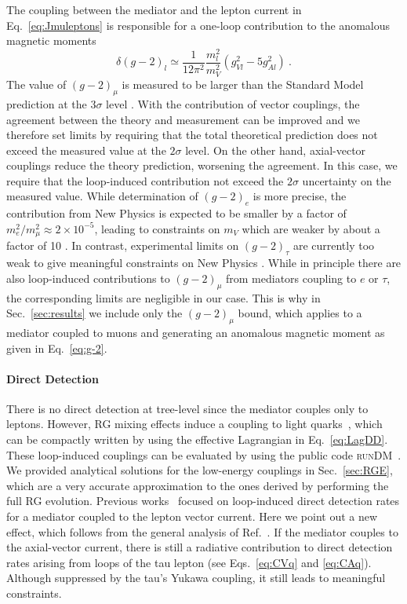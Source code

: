 \documentclass[final,5p,twocolumn]{elsarticle}
\newcommand{\be}{\begin{equation}}
\newcommand{\ee}{\end{equation}}
\newcommand{\Eq}[1]{Eq.~\eqref{#1}}
\newcommand{\Eqs}[2]{Eqs.~\eqref{#1} and \eqref{#2}}
\newcommand{\Ref}[1]{Ref.~\cite{#1}}
\newcommand{\runDM}{\textsc{runDM}\xspace}
\begin{document}
The coupling between the mediator and the lepton current in \Eq{eq:Jmuleptons} is responsible for a one-loop contribution to the anomalous magnetic moments~\cite{Agrawal:2014ufa}
\be\label{eq:g-2}
\delta(g-2)_l \simeq \frac{1}{12 \pi^2} \frac{m_l^2}{m_V^2} \left( g_{Vl}^2 - 5 g_{Al}^2 \right) \ .
\ee
The value of $(g-2)_\mu$ is measured to be larger than the Standard Model prediction at the $3\sigma$ level \cite{Beringer:1900zz}. With the contribution of vector couplings, the agreement between the theory and measurement can be improved and we therefore set limits by requiring that the total theoretical prediction does not exceed the measured value at the $2\sigma$ level. On the other hand, axial-vector couplings reduce the theory prediction, worsening the agreement. In this case, we require that the loop-induced contribution not exceed the $2\sigma$ uncertainty on the measured value. While determination of $(g-2)_e$ is more precise, the contribution from New Physics is expected to be smaller by a factor of $m_e^2/m_\mu^2 \approx 2 \times 10^{-5}$, leading to constraints on $m_V$ which are weaker by about a factor of 10 \cite{Bell:2014tta}. In contrast, experimental limits on $(g-2)_\tau$ are currently too weak to give meaningful constraints on New Physics \cite{Eidelman:2007sb}. While in principle there are also loop-induced contributions to $(g-2)_\mu$ from mediators coupling to $e$ or $\tau$, the corresponding limits are negligible in our case. This is why in Sec.~\ref{sec:results} we include only the $(g-2)_\mu$ bound, which applies to a mediator coupled to muons and generating an anomalous magnetic moment as given in \Eq{eq:g-2}.

\paragraph{Direct Detection} There is no direct detection at tree-level since the mediator couples only to leptons. However, RG mixing effects induce a coupling to light quarks~\cite{Crivellin:2014qxa,D'Eramo:2014aba}, which can be compactly written by using the effective Lagrangian in \Eq{eq:LagDD}. These loop-induced couplings can be evaluated by using the public code \runDM~\cite{runDM}. We provided analytical solutions for the low-energy couplings in Sec.~\ref{sec:RGE}, which are a very accurate approximation to the ones derived by performing the full RG evolution.  Previous works~\cite{Kopp:2009et,Bell:2014tta} focused on loop-induced direct detection rates for a mediator coupled to the lepton vector current. Here we point out a new effect, which follows from the general analysis of \Ref{D'Eramo:2014aba}. If the mediator couples to the axial-vector current, there is still a radiative contribution to direct detection rates arising from loops of the tau lepton (see \Eqs{eq:CVq}{eq:CAq}). Although suppressed by the tau's Yukawa coupling, it still leads to meaningful constraints. 
\end{document}

